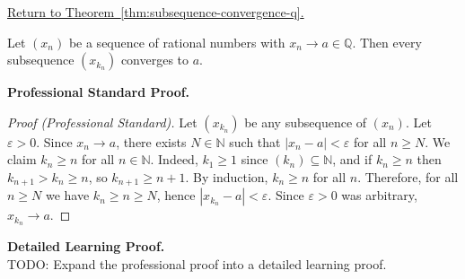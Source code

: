 
\newpage
{}
\label{prf:subsequence-convergence-q}

\begin{remark*}[Return]
\hyperref[thm:subsequence-convergence-q]{Return to Theorem~\ref*{thm:subsequence-convergence-q}.}
\end{remark*}

\begin{theorem*}
Let $(x_n)$ be a sequence of rational numbers with $x_n \to a \in \mathbb{Q}$.
Then every subsequence $(x_{k_n})$ converges to $a$.
\end{theorem*}

\textbf{Professional Standard Proof.}~\\
\begin{proof}
[Proof (Professional Standard)]
Let $(x_{k_n})$ be any subsequence of $(x_n)$.  Let $\varepsilon > 0$.
Since $x_n \to a$, there exists $N \in \mathbb{N}$ such that
$|x_n - a| < \varepsilon$ for all $n \geq N$.
We claim $k_n \geq n$ for all $n \in \mathbb{N}$.
Indeed, $k_1 \geq 1$ since $(k_n) \subseteq \mathbb{N}$, and if
$k_n \geq n$ then $k_{n+1} > k_n \geq n$, so $k_{n+1} \geq n+1$.
By induction, $k_n \geq n$ for all $n$.
Therefore, for all $n \geq N$ we have $k_n \geq n \geq N$, hence
$|x_{k_n} - a| < \varepsilon$.
Since $\varepsilon > 0$ was arbitrary, $x_{k_n} \to a$.
\end{proof}

\textbf{Detailed Learning Proof.}~\\
TODO: Expand the professional proof into a detailed learning proof.


